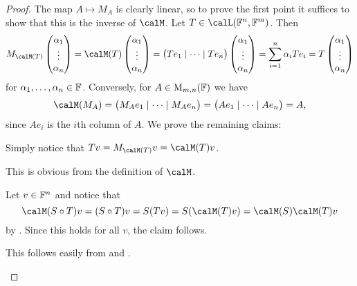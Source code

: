 \begin{proof}
    The map $A \mapsto M_A$ is clearly linear, so to prove the first point it suffices to show that this is the inverse of $\calM$. Let $T \in \lin(\fieldF^n,\fieldF^m)$. Then
    \begin{equation*}
        M_{\smr{T}} \colvec{\alpha_1 \\ \vdots \\ \alpha_n}
            = \smr{T} \colvec{\alpha_1 \\ \vdots \\ \alpha_n}
            = \bigl( Te_1 \mid \cdots \mid Te_n \bigr) \colvec{\alpha_1 \\ \vdots \\ \alpha_n}
            = \sum_{i=1}^n \alpha_i Te_i
            = T \colvec{\alpha_1 \\ \vdots \\ \alpha_n}
    \end{equation*}
    for $\alpha_1, \ldots, \alpha_n \in \mathbb{F}$. Conversely, for $A \in \mathrm{M}_{m,n}(\mathbb{F})$ we have
    \begin{equation*}
        \smr{M_A}
            = \bigl( M_A e_1 \mid \cdots \mid M_A e_n \bigr)
            = \bigl( A e_1 \mid \cdots \mid A e_n \bigr)
            = A,
    \end{equation*}
    since $Ae_i$ is the $i$th column of $A$. We prove the remaining claims:
    \begin{proofsec}
        \item[\itemref{enum:smr-vector-multiplication}]
        Simply notice that $Tv = M_{\smr{T}}v = \smr{T}v$.

        \item[\itemref{enum:smr-of-identity-map}]
        This is obvious from the definition of $\calM$.

        \item[\itemref{enum:smr-multiplicative}]
        Let $v \in \mathbb{F}^n$ and notice that
        \begin{equation*}
            \smr{S \circ T}v
                = (S \circ T) v
                = S(Tv)
                = S(\smr{T}v)
                = \smr{S}\smr{T}v
        \end{equation*}
        by . Since this holds for all $v$, the claim follows.

        \item[\itemref{enum:smr-invertibility}]
        This follows easily from  and .
    \end{proofsec}
\end{proof}
